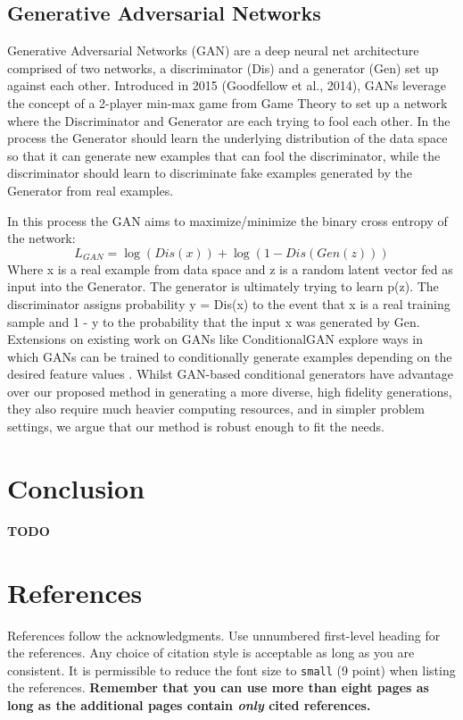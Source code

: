 \documentclass{article}
\begin{document}
\subsection{Generative Adversarial Networks}

Generative Adversarial Networks (GAN) are a deep neural net architecture comprised of two networks, a discriminator (Dis) and a generator (Gen) set up against each other. Introduced in 2015 (Goodfellow et al., 2014), GANs leverage the concept of a 2-player min-max game from Game Theory to set up a network where the Discriminator and Generator are each trying to fool each other. In the process the Generator should learn the underlying distribution of the data space so that it can generate new examples that can fool the discriminator, while the discriminator should learn to discriminate fake examples generated by the Generator from real examples.\par
In this process the GAN aims to maximize/minimize the binary cross entropy of the network:
\begin{equation} 
L_{GAN}=\log(Dis(x))+\log(1-Dis(Gen(z)))
\end{equation}
Where x is a real example from data space and z is a random latent vector fed as input into the Generator. The generator is ultimately trying to learn p(z). The discriminator assigns probability y = Dis(x)  to the event that x is a real training sample and 1 - y to the probability that the input x was generated by Gen. Extensions on existing work on GANs like ConditionalGAN explore ways in which GANs can be trained to conditionally generate examples depending on the desired feature values \cite{Mirza}. Whilst GAN-based conditional generators have advantage over our proposed method in generating a more diverse, high fidelity generations, they also require much heavier computing resources, and in simpler problem settings, we argue that our method is robust enough to fit the needs.

\section{Conclusion}

\textbf{TODO}

\section*{References}

References follow the acknowledgments. Use unnumbered first-level
heading for the references. Any choice of citation style is acceptable
as long as you are consistent. It is permissible to reduce the font
size to \verb+small+ (9 point) when listing the references. {\bf
  Remember that you can use more than eight pages as long as the
  additional pages contain \emph{only} cited references.}
\medskip



\end{document}
